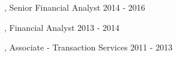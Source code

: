 
\begin{cventries}
  \cventry
    {, \space Senior Financial Analyst} %
    {} %
    {} %
    {2014 - 2016} %
    {
      \begin{cvitems} %
      \end{cvitems}
    }

  \vspace{-4.5mm}

  \cventry
    {, \space Financial Analyst} %
    {} %
    {} %
    {2013 - 2014} %
    {
      \begin{cvitems} %
      \end{cvitems}
    }

  \vspace{-4.5mm}

  \cventry
    {, \space Associate - Transaction Services} %
    {} %
    {} %
    {2011 - 2013} %
    {
      \begin{cvitems} %
      \end{cvitems}
    }

\end{cventries}
